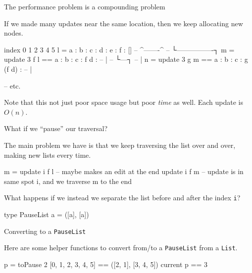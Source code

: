 \documentclass[ignorenonframetext,]{beamer}
\begin{document}
\begin{frame}[fragile]{The performance problem is a compounding problem}

If we made many updates near the same location, then we keep allocating
new nodes.

\begin{haskellcode}
    index
    0   1   2   3   4   5
l = a : b : c : d : e : f : []
--                  ^-------^
--                      └----------------┐
m = update 3 f l == a : b : c : f d : -- |
--                                       └---┐
--                                           |
n = update 3 g m == a : b : c : g (f d) : -- |

-- etc.
\end{haskellcode}

Note that this not just poor space usage but poor \emph{time} as well.
Each update is \(O(n)\).

\end{frame}

\begin{frame}[fragile]{What if we ``pause'' our traversal?}

The main problem we have is that we keep traversing the list over and
over, making new lists every time.

\begin{haskellcode}
m = update i f l -- maybe makes an edit at the end
update i f m -- update is in same spot i, and we traverse m to the end
\end{haskellcode}

What happens if we instead we separate the list before and after the
index \texttt{i}?

\begin{haskellcode}
type PauseList a = ([a], [a])
\end{haskellcode}

\end{frame}

\begin{frame}[fragile]{Converting to a \texttt{PauseList}}

Here are some helper functions to convert from/to a \texttt{PauseList}
from a \texttt{List}.


\pause

\begin{haskellcode}
p = toPause 2 [0, 1, 2, 3, 4, 5] == ([2, 1], [3, 4, 5])
current p == 3
\end{haskellcode}

\end{frame}
\end{document}

